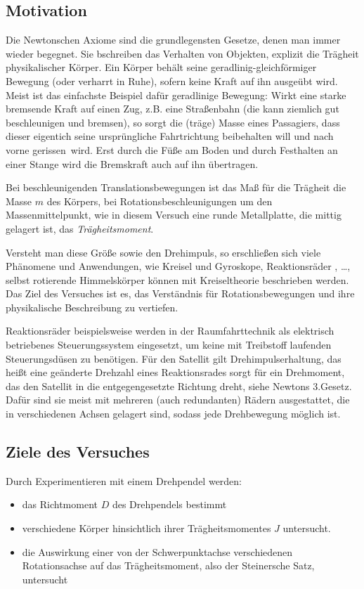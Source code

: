 \subsection{Motivation}
Die Newtonschen Axiome sind die grundlegensten Gesetze, denen man immer wieder begegnet. Sie bschreiben das Verhalten von Objekten, explizit die Trägheit physikalischer Körper. Ein Körper behält seine geradlinig-gleichförmiger Bewegung (oder verharrt in Ruhe), sofern keine Kraft auf ihn ausgeübt wird.
Meist ist das einfachste Beispiel dafür geradlinige Bewegung: Wirkt eine starke bremsende Kraft auf einen Zug, z.B. eine Straßenbahn (die kann ziemlich gut beschleunigen und bremsen), so sorgt die (träge) Masse eines Passagiers, dass dieser eigentich seine ursprüngliche Fahrtrichtung beibehalten will und nach vorne \glq gerissen\grq\ wird. Erst durch die Füße am Boden und durch Festhalten an einer Stange wird die Bremskraft auch auf ihn übertragen.

Bei beschleunigenden Translationsbewegungen ist das Maß für die Trägheit die Masse \(m\) des Körpers, 
bei Rotationsbeschleunigungen um den Massenmittelpunkt, wie in diesem Versuch eine runde Metallplatte, die mittig gelagert ist, das \emph{Trägheitsmoment}. 

Versteht man diese Größe sowie den Drehimpuls, so erschließen sich viele Phänomene und Anwendungen, wie Kreisel und Gyroskope, Reaktionsräder \autocite{Hubble}, \dots , selbst rotierende Himmelskörper können mit Kreiseltheorie beschrieben werden. Das Ziel des Versuches ist es, das Verständnis für Rotationsbewegungen und ihre physikalische Beschreibung zu vertiefen.

Reaktionsräder beispielsweise werden in der Raumfahrttechnik als elektrisch betriebenes Steuerungssystem eingesetzt, um keine mit Treibstoff laufenden Steuerungsdüsen zu benötigen. Für den Satellit gilt Drehimpulserhaltung, das heißt eine geänderte Drehzahl eines Reaktionsrades sorgt für ein Drehmoment, das den Satellit in die entgegengesetzte Richtung dreht, siehe Newtons 3.Gesetz. Dafür sind sie meist mit mehreren (auch redundanten) Rädern ausgestattet, die in verschiedenen Achsen gelagert sind, sodass jede Drehbewegung möglich ist. 

\subsection{Ziele des Versuches}
Durch Experimentieren mit einem Drehpendel werden:
\begin{itemize}
    \item das Richtmoment \(D\) des Drehpendels bestimmt
    \item verschiedene Körper hinsichtlich ihrer Trägheitsmomentes \(J\) untersucht.
    \item die Auswirkung einer von der Schwerpunktachse verschiedenen Rotationsachse auf das Trägheitsmoment, also der Steinersche Satz, untersucht
\end{itemize}


